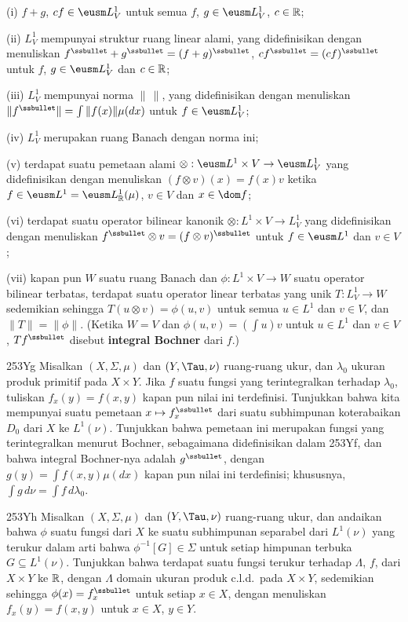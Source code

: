 {\quad (i) $f+g$, $cf\in\eusm L^1_V$ untuk semua $f$,
$g\in\eusm L^1_V$, $c\in\Bbb R$;

\quad (ii) $L^1_V$ mempunyai struktur ruang linear alami, yang didefinisikan
dengan menuliskan $f^{\ssbullet}+g^{\ssbullet}=(f+g)^{\ssbullet}$,
$cf^{\ssbullet}=(cf)^{\ssbullet}$ untuk $f$, $g\in\eusm L^1_V$ dan
$c\in\Bbb R$;

\quad (iii) $L^1_V$ mempunyai norma $\|\,\|$, yang didefinisikan dengan
menuliskan $\|f^{\ssbullet}\|=\int\|f(x)\|\mu(dx)$ untuk
$f\in\eusm L^1_V$;

\quad (iv) $L^1_V$ merupakan ruang Banach dengan norma ini;

\quad (v) terdapat suatu pemetaan alami
$\otimes:\eusm L^1\times V\to\eusm L^1_V$ yang didefinisikan dengan
menuliskan $(f\otimes v)(x)=f(x)v$ ketika
$f\in\eusm L^1=\eusm L^1_{\Bbb R}(\mu)$,
$v\in V$ dan $x\in\dom f$;

\quad (vi) terdapat suatu operator bilinear kanonik
$\otimes:L^1\times V\to L^1_V$ yang didefinisikan dengan menuliskan
$f^{\ssbullet}\otimes v=(f\otimes v)^{\ssbullet}$ untuk
$f\in\eusm L^1$ dan
$v\in V$;

\quad (vii) kapan pun $W$ suatu ruang Banach dan
$\phi:L^1\times V\to W$ suatu operator bilinear terbatas,
terdapat suatu operator linear terbatas yang unik
$T:L^1_V\to W$ sedemikian sehingga $T(u\otimes v)=\phi(u,v)$
untuk semua $u\in L^1$ dan $v\in V$, dan $\|T\|=\|\phi\|$.
(Ketika $W=V$ dan
$\phi(u,v)=(\int u)v$ untuk $u\in L^1$ dan $v\in V$, $Tf^{\ssbullet}$
disebut {\bf integral Bochner} dari $f$.)


\spheader 253Yg Misalkan $(X,\Sigma,\mu)$ dan $(Y,\Tau,\nu)$
ruang-ruang ukur, dan
$\lambda_0$ ukuran produk primitif pada $X\times Y$. Jika $f$ suatu
fungsi yang terintegralkan terhadap $\lambda_0$, tuliskan
$f_x(y)=f(x,y)$ kapan pun nilai ini terdefinisi. Tunjukkan bahwa kita
mempunyai suatu pemetaan $x\mapsto f_x^{\ssbullet}$ dari suatu subhimpunan
koterabaikan
$D_0$ dari $X$ ke $L^1(\nu)$. Tunjukkan bahwa pemetaan ini merupakan
fungsi yang terintegralkan menurut Bochner, sebagaimana didefinisikan dalam 253Yf,
dan bahwa integral Bochner-nya adalah $g^{\ssbullet}$, dengan
$g(y)=\int f(x,y)\mu(dx)$ kapan pun nilai ini terdefinisi; khususnya,
$\int g\,d\nu=\int f\,d\lambda_0$.

\spheader 253Yh Misalkan $(X,\Sigma,\mu)$ dan $(Y,\Tau,\nu)$
ruang-ruang ukur, dan
andaikan bahwa $\phi$ suatu fungsi dari $X$ ke suatu subhimpunan separabel
dari $L^1(\nu)$ yang terukur dalam arti bahwa
$\phi^{-1}[G]\in\Sigma$ untuk setiap himpunan terbuka
$G\subseteq L^1(\nu)$. Tunjukkan bahwa
terdapat suatu fungsi terukur terhadap $\Lambda$, $f$, dari $X\times Y$
ke $\Bbb
R$, dengan $\Lambda$ domain ukuran produk c.l.d.\ pada
$X\times Y$, sedemikian sehingga $\phi(x)=f_x^{\ssbullet}$ untuk setiap
$x\in X$, dengan menuliskan $f_x(y)=f(x,y)$ untuk $x\in X$, $y\in Y$.

}
